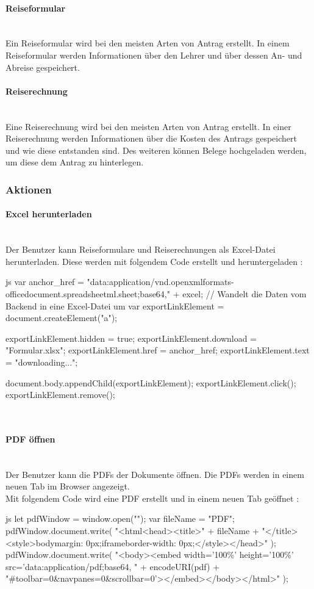 \paragraph{Reiseformular}~\\
Ein Reiseformular wird bei den meisten Arten von Antrag erstellt. In einem Reiseformular werden Informationen über den Lehrer und über dessen An- und Abreise gespeichert.
\paragraph{Reiserechnung}~\\
Eine Reiserechnung wird bei den meisten Arten von Antrag erstellt. In einer Reiserechnung werden Informationen über die Kosten des Antrags gespeichert und wie diese entstanden sind. Des weiteren können Belege hochgeladen werden, um diese dem Antrag zu hinterlegen.
\subsubsection{Aktionen}
\paragraph{Excel herunterladen}~\\
Der Benutzer kann Reiseformulare und Reiserechnungen als Excel-Datei herunterladen. Diese werden mit folgendem Code erstellt und heruntergeladen \cite{down_excel}:
\begin{code}{js}
	var anchor_href =
	"data:application/vnd.openxmlformats-officedocument.spreadsheetml.sheet;base64," +
	excel;	// Wandelt die Daten vom Backend in eine Excel-Datei um
	var exportLinkElement = document.createElement("a");
	
	exportLinkElement.hidden = true;
	exportLinkElement.download = "Formular.xlsx";
	exportLinkElement.href = anchor_href;
	exportLinkElement.text = "downloading...";
	
	document.body.appendChild(exportLinkElement);
	exportLinkElement.click();
	exportLinkElement.remove();
\end{code}
~
\newpage
\paragraph{PDF öffnen}~\\
Der Benutzer kann die PDFs der Dokumente öffnen. Die PDFs werden in einem neuen Tab im Browser angezeigt.\\
Mit folgendem Code wird eine PDF erstellt und in einem neuen Tab geöffnet \cite{sof_pdf}:
\begin{code}{js}
	let pdfWindow = window.open("");
	var fileName = "PDF";
	pdfWindow.document.write(
	"<html<head><title>" +
	fileName +
	"</title><style>body{margin: 0px;}iframe{border-width: 0px;}</style></head>"
	);
	pdfWindow.document.write(
	"<body><embed width='100\%' height='100\%' src='data:application/pdf;base64, " +
	encodeURI(pdf) +
	"#toolbar=0\&navpanes=0\&scrollbar=0'></embed></body></html>"
	);
\end{code}
~\\
